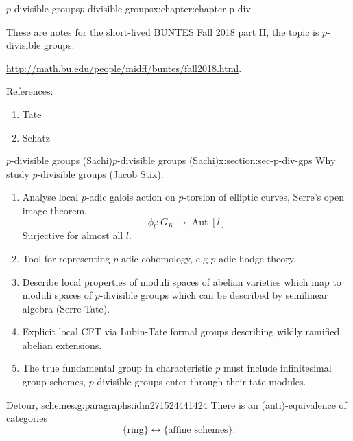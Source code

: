 \documentclass[oneside,10pt,]{book}
\numberwithin{equation}{section}
\newcommand{\lb}{[}
\newcommand{\rb}{]}
\DeclareMathOperator{\Aut}{Aut}
\begin{document}
\begin{chapterptx}{\(p\)-divisible groups}{}{\(p\)-divisible groups}{}{}{x:chapter:chapter-p-div}
\begin{introduction}{}%
These are notes for the short-lived BUNTES Fall 2018 part II, the topic is \(p\)-divisible groups.%
\par
\url{http://math.bu.edu/people/midff/buntes/fall2018.html}.%
\par
References:%
\begin{enumerate}
\item{}Tate%
\item{}Schatz%
\end{enumerate}
%
\end{introduction}%
%
%
\typeout{************************************************}
\typeout{************************************************}
%
\begin{sectionptx}{\(p\)-divisible groups (Sachi)}{}{\(p\)-divisible groups (Sachi)}{}{}{x:section:sec-p-div-gps}
Why study  \(p\)-divisible groups (Jacob Stix).%
\begin{enumerate}
\item{}Analyse local \(p\)-adic galois action on \(p\)-torsion of elliptic curves, Serre's open image theorem.%
\begin{equation*}
\phi_l \colon G_K \to \Aut \lb l \rb
\end{equation*}
Surjective for almost all \(l\).%
\item{}Tool for representing \(p\)-adic cohomology, e.g \(p\)-adic hodge theory.%
\item{}Describe local properties of moduli spaces of abelian varieties which map to moduli spaces of \(p\)-divisible groups which can be described by semilinear algebra (Serre-Tate).%
\item{}Explicit local CFT via Lubin-Tate formal groups describing wildly ramified abelian extensions.%
\item{}The true fundamental group in characteristic \(p\) must include infinitesimal group schemes, \(p\)-divisible groups enter through their tate modules.%
\end{enumerate}
%
\begin{paragraphs}{Detour, schemes.}{g:paragraphs:idm271524441424}%
There is an (anti)-equivalence of categories%
\begin{equation*}
\{\text{ring}\} \leftrightarrow\{\text{affine schemes}\}\text{.}
\end{equation*}

\end{paragraphs}
\end{sectionptx}
\end{chapterptx}
\end{document}
